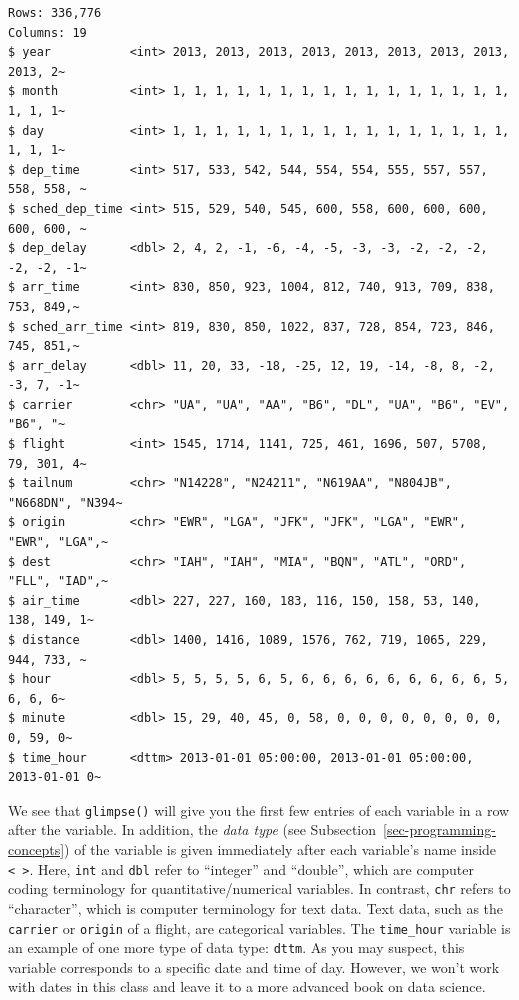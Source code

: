 \documentclass[
  letterpaper,
  DIV=11,
  numbers=noendperiod]{scrreprt}
\theoremstyle{definition}
\theoremstyle{remark}
\begin{document}
\begin{verbatim}
Rows: 336,776
Columns: 19
$ year           <int> 2013, 2013, 2013, 2013, 2013, 2013, 2013, 2013, 2013, 2~
$ month          <int> 1, 1, 1, 1, 1, 1, 1, 1, 1, 1, 1, 1, 1, 1, 1, 1, 1, 1, 1~
$ day            <int> 1, 1, 1, 1, 1, 1, 1, 1, 1, 1, 1, 1, 1, 1, 1, 1, 1, 1, 1~
$ dep_time       <int> 517, 533, 542, 544, 554, 554, 555, 557, 557, 558, 558, ~
$ sched_dep_time <int> 515, 529, 540, 545, 600, 558, 600, 600, 600, 600, 600, ~
$ dep_delay      <dbl> 2, 4, 2, -1, -6, -4, -5, -3, -3, -2, -2, -2, -2, -2, -1~
$ arr_time       <int> 830, 850, 923, 1004, 812, 740, 913, 709, 838, 753, 849,~
$ sched_arr_time <int> 819, 830, 850, 1022, 837, 728, 854, 723, 846, 745, 851,~
$ arr_delay      <dbl> 11, 20, 33, -18, -25, 12, 19, -14, -8, 8, -2, -3, 7, -1~
$ carrier        <chr> "UA", "UA", "AA", "B6", "DL", "UA", "B6", "EV", "B6", "~
$ flight         <int> 1545, 1714, 1141, 725, 461, 1696, 507, 5708, 79, 301, 4~
$ tailnum        <chr> "N14228", "N24211", "N619AA", "N804JB", "N668DN", "N394~
$ origin         <chr> "EWR", "LGA", "JFK", "JFK", "LGA", "EWR", "EWR", "LGA",~
$ dest           <chr> "IAH", "IAH", "MIA", "BQN", "ATL", "ORD", "FLL", "IAD",~
$ air_time       <dbl> 227, 227, 160, 183, 116, 150, 158, 53, 140, 138, 149, 1~
$ distance       <dbl> 1400, 1416, 1089, 1576, 762, 719, 1065, 229, 944, 733, ~
$ hour           <dbl> 5, 5, 5, 5, 6, 5, 6, 6, 6, 6, 6, 6, 6, 6, 6, 5, 6, 6, 6~
$ minute         <dbl> 15, 29, 40, 45, 0, 58, 0, 0, 0, 0, 0, 0, 0, 0, 0, 59, 0~
$ time_hour      <dttm> 2013-01-01 05:00:00, 2013-01-01 05:00:00, 2013-01-01 0~
\end{verbatim}

We see that \texttt{glimpse()} will give you the first few entries of
each variable in a row after the variable. In addition, the \emph{data
type} (see Subsection~\ref{sec-programming-concepts}) of the variable is
given immediately after each variable's name inside
\texttt{\textless{}\ \textgreater{}}. Here, \texttt{int} and
\texttt{dbl} refer to ``integer'' and ``double'', which are computer
coding terminology for quantitative/numerical variables. In contrast,
\texttt{chr} refers to ``character'', which is computer terminology for
text data. Text data, such as the \texttt{carrier} or \texttt{origin} of
a flight, are categorical variables. The \texttt{time\_hour} variable is
an example of one more type of data type: \texttt{dttm}. As you may
suspect, this variable corresponds to a specific date and time of day.
However, we won't work with dates in this class and leave it to a more
advanced book on data science.
\end{document}
